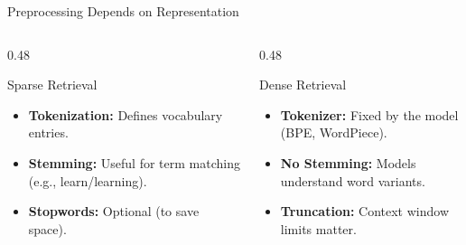 \documentclass[aspectratio=169]{beamer}
\newif\ifanimated
\newcommand{\cpause}{\ifanimated\pause\fi}
\begin{document}
\begin{frame}[fragile]{Preprocessing Depends on Representation}
\begin{columns}[T]
\begin{column}{0.48\textwidth}
\begin{block}{Sparse Retrieval}
\begin{itemize}
    \item \faCut \textbf{Tokenization:} Defines vocabulary entries.
    \item \faLayerGroup \textbf{Stemming:} Useful for term matching (e.g., learn/learning).
    \item \faTrash[regular] \textbf{Stopwords:} Optional (to save space).
\end{itemize}
\end{block}
\cpause
\end{column}

\begin{column}{0.48\textwidth}
\begin{block}{Dense Retrieval}
\begin{itemize}
    \item \faRobot \textbf{Tokenizer:} Fixed by the model (BPE, WordPiece).
    \item \faBan \textbf{No Stemming:} Models understand word variants.
    \item \faStream \textbf{Truncation:} Context window limits matter.
\end{itemize}
\end{block}
\cpause
\end{column}
\end{columns}

\vspace{1em}

\begin{center}

\end{center}
\end{frame}
\end{document}
